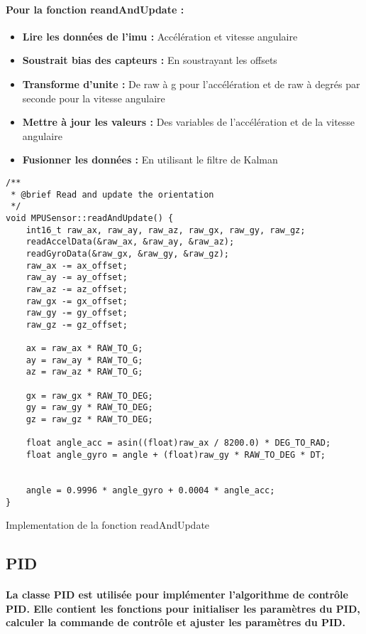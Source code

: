 \paragraph*{Pour la fonction reandAndUpdate :}

\begin{itemize}
	\item \textbf{Lire les données de l'\gls{imu} :} Accélération et vitesse angulaire
	\item \textbf{Soustrait bias des capteurs :} En soustrayant les offsets
	\item \textbf{Transforme d'unite :} De raw à g pour l'accélération et de raw à degrés par seconde pour la vitesse angulaire
	\item \textbf{Mettre à jour les valeurs :} Des variables de l'accélération et de la vitesse angulaire
	\item \textbf{Fusionner les données :} En utilisant le filtre de Kalman
\end{itemize}

\newpage

\begin{listing}[!htpb]
	\begin{verbatim}
/**
 * @brief Read and update the orientation
 */
void MPUSensor::readAndUpdate() {
	int16_t raw_ax, raw_ay, raw_az, raw_gx, raw_gy, raw_gz;
	readAccelData(&raw_ax, &raw_ay, &raw_az);
	readGyroData(&raw_gx, &raw_gy, &raw_gz);
	raw_ax -= ax_offset;
	raw_ay -= ay_offset;
	raw_az -= az_offset;
	raw_gx -= gx_offset;
	raw_gy -= gy_offset;
	raw_gz -= gz_offset;
	
	ax = raw_ax * RAW_TO_G;
	ay = raw_ay * RAW_TO_G;
	az = raw_az * RAW_TO_G;

	gx = raw_gx * RAW_TO_DEG;
	gy = raw_gy * RAW_TO_DEG;
	gz = raw_gz * RAW_TO_DEG;

	float angle_acc = asin((float)raw_ax / 8200.0) * DEG_TO_RAD;
	float angle_gyro = angle + (float)raw_gy * RAW_TO_DEG * DT;

	
	angle = 0.9996 * angle_gyro + 0.0004 * angle_acc;
}
	\end{verbatim}
	\caption{Implementation de la fonction readAndUpdate}
	\label{listing:mpu-read-and-update}
\end{listing}

\newpage

\subsection{PID}

\paragraph{La classe PID est utilisée pour implémenter l'algorithme de contrôle PID. Elle contient les fonctions pour initialiser les paramètres du PID, calculer la commande de contrôle et ajuster les paramètres du PID.}

